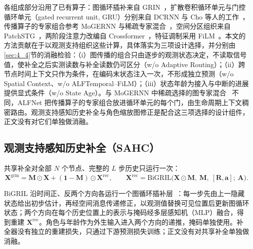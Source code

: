 各组成部分沿用了已有算子：图循环插补来自 GRIN~\citep{cini2022filling}，扩散卷积循环单元与门控循环单元（gated recurrent unit, GRU）分别来自 DCRNN 与 Cho 等人的工作~\citep{li2018diffusion,cho2014learning}，传播算子的专家组合参考 MoGERNN 与稀疏专家混合~\citep{zhou2025mogernn,shazeer2017outrageously,wang2023graph}，空间分区组织来自 PatchSTG~\citep{fang2025efficient}，两阶段注意力改编自 Crossformer~\citep{zhang2023crossformer}，特征调制采用 FiLM~\citep{perez2018film}。本文的方法贡献在于以观测支持组织这些计算，具体落实为三项设计选择，并分别由\ref{sec:4_4}节的消融检验：（i）图传播的组合只由逐步的观测状态决定，不读取信号值，使补全之后实测读数与补全读数仍可区分（w/o Adaptive Routing）；（ii）跨节点时间上下文只作为条件，在编码末状态注入一次，不形成独立预测（w/o Spatial Context、w/o ALFTemporal–FiLM）；（iii）状态年龄为接入与中断的进展提供显式条件（w/o State Age）。与 MoGERNN 中稀疏选择的图专家混合~\citep{zhou2025mogernn} 不同，ALFNet 把传播算子的专家组合放进循环单元的每个门，由生命周期上下文稠密路由。观测支持感知历史补全与角色缩放图修正是配合这三项选择的设计组件，正文没有对它们单独做消融。

\subsection{观测支持感知历史补全（SAHC）}\label{sec:3_3}

共享补全对全部 $N$ 个节点、完整的 $L$ 步历史只运行一次：
\begin{equation}\label{eq:2}
\mathbf{X}^{\mathrm{grin}}=\mathbf{M}\odot\mathbf{X}+(\mathbf{1}-\mathbf{M})\odot\mathbf{X}^{\mathrm{rec}},\qquad
\mathbf{X}^{\mathrm{rec}}=\mathrm{BiGRIL}\big(\mathbf{X}\odot\mathbf{M},\ \mathbf{M},\ [\mathbf{R},\mathbf{a}];\ \mathbf{A}\big).
\end{equation}

BiGRIL 沿时间正、反两个方向各运行一个图循环插补层~\citep{cini2022filling}：每一步先由上一隐藏状态给出初步估计，再经空间消息传递修正，以观测值替换可见位置后更新图循环状态；两个方向在每个历史位置上的表示与掩码经多层感知机（MLP）融合，得到重建 $\mathbf{X}^{\mathrm{rec}}$。角色与年龄作为外生输入进入两个方向的递推，掩码单独使用。补全器没有独立的重建损失，只通过下游预测损失训练；正文没有对共享补全单独做消融。

